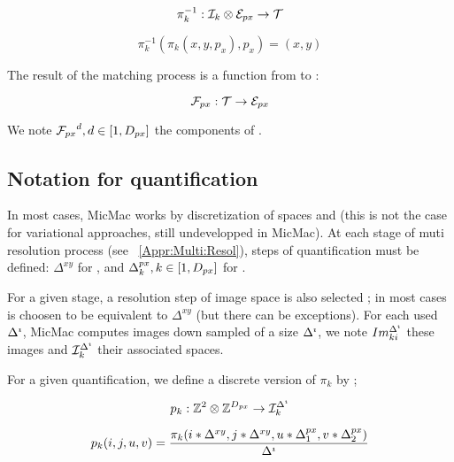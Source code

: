 \begin{equation}
   \pi_k^{-1} :   \EIm \otimes \EPx \rightarrow \ETer
\end{equation}

\begin{equation}
   \pi_k^{-1}(\pi_k(x,y,p_x),p_x) = (x,y) 
\end{equation}


The result of the matching process is a function \FPx from
\ETer to \EPx:

\begin{equation}
   \FPx :   \ETer  \rightarrow  \EPx 
\end{equation}

We note ${\FPx}^d,d\in [1,\DimPx]$ the components of \FPx.


\subsection{Notation for quantification}

\label{Disc:Quant}


In most cases, MicMac works by discretization of
spaces \ETer and \EPx (this is not the case for 
variational approaches, still undevelopped in MicMac).
At each stage of muti resolution process (see ~\ref{Appr:Multi:Resol}),
steps of quantification must be defined: $\Delta^{xy}$ for \ETer ,
and $\Delta^{px}_k, k \in [1,\DimPx]$ for  \EPx.



For a given stage, a resolution  step \DeltaI of image space
is also selected ; in most cases  \DeltaI is choosen to be equivalent
to $\Delta^{xy}$ (but there can be exceptions).
For each used $\DeltaI$, MicMac computes images down sampled of a size $\DeltaI$, we note $Im_{ki}^{\DeltaI}$  these images
and $\EIm^{\DeltaI}$  their associated spaces.



For a given quantification, we define a discrete version
of $\pi_k$ by ;


\begin{equation}
   p_k : \ZZ^2 \otimes\ZZ^{\DimPx} \rightarrow \EIm^{\DeltaI}
\end{equation}

\begin{equation}
   p_k(i,j,u,v) = \frac{\pi_k(i*\Delta^{xy},j*\Delta^{xy},u*\Delta^{px}_1,v*\Delta^{px}_2)}{\DeltaI}
\label{EQ:Disc:Proj}
\end{equation}

